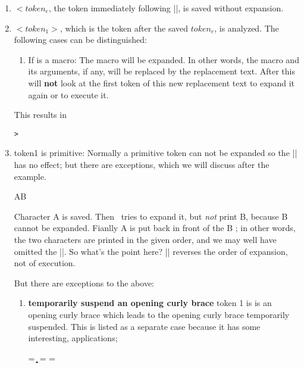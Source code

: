 \begin{enumerate}
\item  $<token_e$, the token immediately following |\expandafter|, is saved without expansion.
\item $<token_1>$, which is the token after the saved $token_e$, is analyzed. The following cases can be distinguished:
\begin{enumerate}
\item If is a macro: The macro will be expanded. In other words, the macro and its arguments, if any, will be replaced by the replacement text. After this \tex will \textbf{not} look at the first token of this new replacement text to expand it again or to execute it.
\end{enumerate}



\begin{teX}
\def\xx [#1]{[#1]}
\def\yy{[ABC]}

\expandafter\xx\yy
\end{teX}

This results in 
\def\xx [#1]{[#1]}
\def\yy{[ABC]}

\texttt{> \expandafter\xx\yy}


\item token1 is primitive: Normally a primitive token can not be expanded so the |\expandafter| has no effect; but there are exceptions, which we will discuss after the example.

\expandafter AB

Character A is saved. Then \tex\ tries to expand it, but \textit{not} print B, because B cannot be expanded. Fianlly A is put back in front of the B ; in other words, the two characters are printed in the given order, and we may well have omitted the |\expandafter|. So what's the point here? |\expandafter| reverses the order of expansion, not of execution.

\noindent But there are exceptions to the above:
\begin{enumerate}
\item \textbf{temporarily suspend an opening curly brace} token 1 is is an opening curly brace which leads to the opening curly brace temporarily suspended. This is listed as a separate case because it has some interesting, applications;

\begin{teX}
\newtoks\ta
\newtoks\tb
\ta = {\a\b\c}
\tb=\expandafter{\the\ta}
\tb={\the\ta}
\tb
\end{teX}
\begingroup


\end{enumerate}
\end{enumerate}

